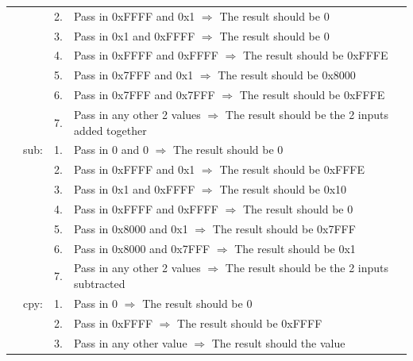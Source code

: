 \documentclass{article}
\begin{document}
\begin{longtable}{ r r r p{11cm} }
				                &      & 2. & Pass in 0xFFFF and 0x1 $\Rightarrow$ The result should be 0\\
				                &      & 3. & Pass in 0x1 and 0xFFFF $\Rightarrow$ The result should be 0\\
				                &      & 4. & Pass in 0xFFFF and 0xFFFF $\Rightarrow$ The result should be 0xFFFE\\
				                &      & 5. & Pass in 0x7FFF and 0x1 $\Rightarrow$ The result should be 0x8000\\
				                &      & 6. & Pass in 0x7FFF and 0x7FFF $\Rightarrow$ The result should be 0xFFFE\\
				                &      & 7. & Pass in any other 2 values $\Rightarrow$ The result should be the 2 inputs added together\\
				                & sub: & 1. & Pass in 0 and 0 $\Rightarrow$ The result should be 0\\
				                &      & 2. & Pass in 0xFFFF and 0x1 $\Rightarrow$ The result should be 0xFFFE\\
				                &      & 3. & Pass in 0x1 and 0xFFFF $\Rightarrow$ The result should be 0x10\\
				                &      & 4. & Pass in 0xFFFF and 0xFFFF $\Rightarrow$ The result should be 0\\
				                &      & 5. & Pass in 0x8000 and 0x1 $\Rightarrow$ The result should be 0x7FFF\\
				                &      & 6. & Pass in 0x8000 and 0x7FFF $\Rightarrow$ The result should be 0x1\\
				                &      & 7. & Pass in any other 2 values $\Rightarrow$ The result should be the 2 inputs subtracted\\
				                & cpy: & 1. & Pass in 0 $\Rightarrow$ The result should be 0\\
				                &      & 2. & Pass in 0xFFFF $\Rightarrow$ The result should be 0xFFFF\\
				                &      & 3. & Pass in any other value $\Rightarrow$ The result should the value\\
			\end{longtable}
\end{document}
